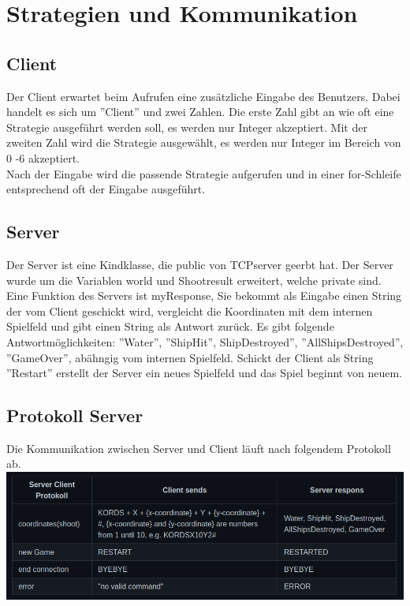 \section{Strategien und Kommunikation}

\subsection{Client}

Der Client erwartet beim Aufrufen eine zusätzliche Eingabe des Benutzers. Dabei handelt es sich um ''Client'' und zwei Zahlen. Die erste Zahl gibt an wie oft 
eine Strategie ausgeführt werden soll, es werden nur Integer akzeptiert. Mit der zweiten Zahl wird die Strategie ausgewählt, es werden nur Integer im Bereich von 
0 -6 akzeptiert. \\Nach der Eingabe wird die passende Strategie aufgerufen und in einer for-Schleife entsprechend oft der Eingabe ausgeführt.

\subsection{Server}

Der Server ist eine Kindklasse, die public von TCPserver geerbt hat. Der Server wurde um die Variablen world und Shootresult erweitert, welche private sind. 
Eine Funktion des Servers ist myResponse, Sie bekommt als Eingabe einen String der vom Client geschickt wird, 
vergleicht die Koordinaten mit dem internen Spielfeld und gibt einen String als Antwort zurück. Es gibt folgende Antwortmöglichkeiten: ''Water'', ''ShipHit'', 
ShipDestroyed'', ''AllShipsDestroyed'', ''GameOver'', abähngig vom internen Spielfeld. Schickt der Client als String ''Restart'' erstellt der Server ein neues Spielfeld und das Spiel beginnt von neuem.

\subsection{Protokoll Server}
Die Kommunikation zwischen Server und Client läuft nach folgendem Protokoll ab.\\
\includegraphics[scale=0.5]{ProtokollServer.png}\\

